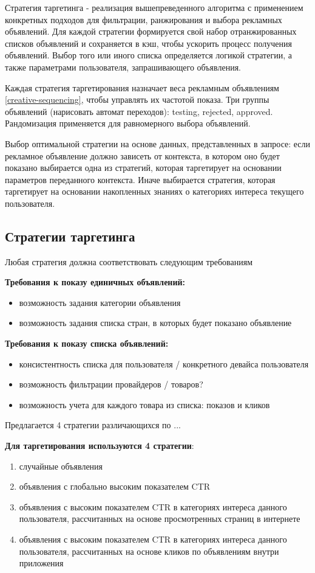 \documentclass[times]{itmo-student-thesis}
\begin{document}
Стратегия таргетинга - реализация вышепреведенного алгоритма с применением конкретных подходов для фильтрации, ранжирования и выбора рекламных объявлений. Для каждой стратегии формируется свой набор отранжированных списков объявлений и сохраняется в кэш, чтобы ускорить процесс получения объявлений. Выбор того или иного списка определяется логикой стратегии, а также параметрами пользователя, запрашивающего объявления. 

Каждая стратегия таргетирования назначает веса рекламным объявлениям \ref{creative-sequencing}, чтобы управлять их частотой показа. Три группы объявлений (нарисовать автомат переходов): testing, rejected, approved. Рандомизация применяется для равномерного выбора объявлений. 

Выбор оптимальной стратегии на основе данных, представленных в запросе: если рекламное объявление должно зависеть от контекста, в котором оно будет показано выбирается одна из стратегий, которая таргетирует на основании параметров переданного контекста. Иначе выбирается стратегия, которая таргетирует на основании накопленных знаниях о категориях интереса текущего пользователя.

\subsection{Стратегии таргетинга}\label{sec:strategies}

Любая стратегия должна соответствовать следующим требованиям

\textbf{Требования к показу единичных объявлений:}
\begin{itemize}
	\item возможность задания категории объявления
	\item возможность задания списка стран, в которых будет показано объявление
\end{itemize}

\textbf{Требования к показу списка объявлений:}
\begin{itemize}
	\item консистентность списка для пользователя / конкретного девайса пользователя
	\item возможность фильтрации провайдеров / товаров?
	\item возможность учета для каждого товара из списка: показов и кликов
\end{itemize}

Предлагается 4 стратегии различающихся по ...

\textbf{Для таргетирования используются 4 стратегии}:
\begin{enumerate}
	\item случайные объявления
	\item объявления с глобально высоким показателем CTR
	\item объявления с высоким показателем CTR в категориях интереса данного пользователя, рассчитанных на основе просмотренных страниц в интернете
	\item объявления с высоким показателем CTR в категориях интереса данного пользователя, рассчитанных на основе кликов по объявлениям внутри приложения
\end{enumerate}
\end{document}
